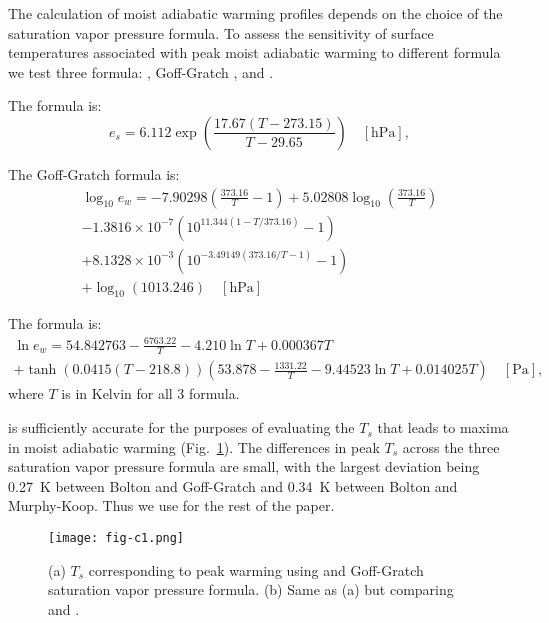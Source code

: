 \documentclass[draft]{ametsocV6.1}
\begin{document}
\appendix[C] 
\label{app:svp}
The calculation of moist adiabatic warming profiles depends on the choice of the saturation vapor pressure formula. To assess the sensitivity of surface temperatures associated with peak moist adiabatic warming to different formula we test three formula: \cite{bolton1980}, Goff-Gratch \citep{list1949}, and \cite{murphy2005}.

The \cite{bolton1980} formula is:
\begin{equation}
e_s = 6.112 \exp\left(\frac{17.67 (T - 273.15)}{T - 29.65}\right) \quad [\text{hPa}],
\end{equation}

The Goff-Gratch formula is:
\begin{multline}
\log_{10} e_w = -7.90298 \left(\frac{373.16}{T} - 1\right) + 5.02808 \log_{10}\left(\frac{373.16}{T}\right)\\ - 1.3816 \times 10^{-7} \left(10^{11.344 (1 - T/373.16)} - 1\right)\\ + 8.1328 \times 10^{-3} \left(10^{-3.49149 (373.16/T - 1)} - 1\right)\\ + \log_{10}(1013.246) \quad [\text{hPa}]
\end{multline}

The \cite{murphy2005} formula is:
\begin{multline}
\ln e_w = 54.842763 - \frac{6763.22}{T} - 4.210 \ln T + 0.000367 T\\ + \tanh\left(0.0415 (T - 218.8)\right) \left(53.878 - \frac{1331.22}{T} - 9.44523 \ln T + 0.014025 T\right) \quad [\text{Pa}],
\end{multline}
where $T$ is in Kelvin for all 3 formula.

\cite{bolton1980} is sufficiently accurate for the purposes of evaluating the $T_s$ that leads to maxima in moist adiabatic warming (Fig.~\ref{fig:fig-c1}). The differences in peak $T_s$ across the three saturation vapor pressure formula are small, with the largest deviation being 0.27~K between Bolton and Goff-Gratch and 0.34~K between Bolton and Murphy-Koop. Thus we use \cite{bolton1980} for the rest of the paper.

\begin{figure}[htbp]
 \centering
 \texttt{[image: fig-c1.png]}
 \caption{(a) $T_s$ corresponding to peak warming using \cite{bolton1980} and Goff-Gratch saturation vapor pressure formula. (b) Same as (a) but comparing \cite{bolton1980} and \cite{murphy2005}.}\label{fig:fig-c1}
\end{figure}

\clearpage




\end{document}
